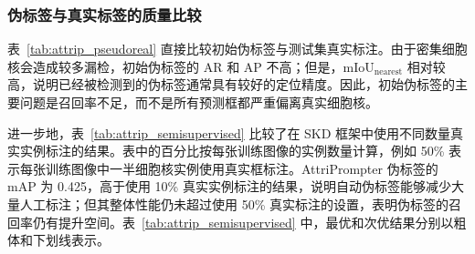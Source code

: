 \subsubsection{伪标签与真实标签的质量比较}

表~\ref{tab:attrip_pseudoreal} 直接比较初始伪标签与测试集真实标注。由于密集细胞核会造成较多漏检，初始伪标签的 AR 和 AP 不高；但是，$\mathrm{mIoU}_{\mathrm{nearest}}$ 相对较高，说明已经被检测到的伪标签通常具有较好的定位精度。因此，初始伪标签的主要问题是召回率不足，而不是所有预测框都严重偏离真实细胞核。

\begin{table}[t]
\caption{伪标签质量对比}
\label{tab:attrip_pseudoreal}
\begin{center}
\end{center}
\vskip -0.1in
\end{table}

进一步地，表~\ref{tab:attrip_semisupervised} 比较了在 SKD 框架中使用不同数量真实实例标注的结果。表中的百分比按每张训练图像的实例数量计算，例如 50\% 表示每张训练图像中一半细胞核实例使用真实框标注。AttriPrompter 伪标签的 mAP 为 0.425，高于使用 10\% 真实实例标注的结果，说明自动伪标签能够减少大量人工标注；但其整体性能仍未超过使用 50\% 真实标注的设置，表明伪标签的召回率仍有提升空间。表~\ref{tab:attrip_semisupervised} 中，最优和次优结果分别以粗体和下划线表示。

\begin{table}[t]
\caption{伪标签与真实标注监督对比}
\label{tab:attrip_semisupervised}
\begin{center}
\end{center}
\vskip -0.15in
\end{table}


